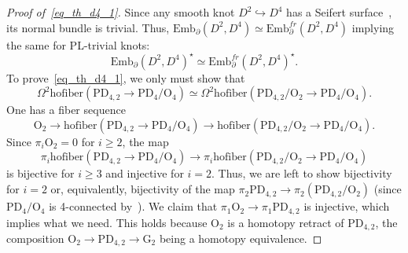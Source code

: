 \documentclass[11pt]{amsart}
\theoremstyle{definition}
\newcommand{\Ebar}{\overline{\mathrm{Emb}}}
\newcommand{\Emb}{\mathrm{Emb}}
\newcommand{\PL}{\mathrm{PL}}
\newcommand{\OO}{\mathrm{O}}
\newcommand{\PD}{\mathrm{PD}}
\newcommand{\hofiber}{\mathrm{hofiber}}
\numberwithin{equation}{section}
\begin{document}
\begin{proof}[Proof of~\eqref{eq_th_d4_1}]
\smallskip

Since any smooth knot $D^2\hookrightarrow D^4$ has a Seifert surface~\cite{Levine}, its normal bundle is trivial. Thus,
$\Emb_\partial(D^2,D^4)\simeq \Emb_\partial^{fr}(D^2,D^4)$ implying the same for PL-trivial knots:
\begin{equation}\label{eq:42}
\Emb_\partial(D^2,D^4)^\star\simeq \Emb_\partial^{fr}(D^2,D^4)^\star.
\end{equation}
To prove~\eqref{eq_th_d4_1}, we only must show that
\[
\Omega^2\hofiber(\PD_{4,2}\to\PD_4/\OO_4)\simeq\Omega^2\hofiber(\PD_{4,2}/\OO_2\to\PD_4/\OO_4).
\]
One has a fiber sequence
\[
\OO_2\to\hofiber(\PD_{4,2}\to\PD_4/\OO_4)\to\hofiber(\PD_{4,2}/\OO_2\to\PD_4/\OO_4).
\]
Since $\pi_i\OO_2=0$ for $i\geq 2$, the map
\[
\pi_i\hofiber(\PD_{4,2}\to\PD_4/\OO_4)\to\pi_i\hofiber(\PD_{4,2}/\OO_2\to\PD_4/\OO_4)
\]
is bijective for $i\geq 3$ and injective for $i=2$. Thus, we are left to show bijectivity for $i=2$ or, equivalently,
bijectivity of the map $\pi_2\PD_{4,2}\to\pi_2(\PD_{4,2}/\OO_2)$ (since $\PD_4/\OO_4$ is 4-connected by~\cite[Theorem~8.3C]{FQ}). We claim that $\pi_1\OO_2\to\pi_1\PD_{4,2}$ is 
injective, which implies what we need. This holds because $\OO_2$ is a homotopy retract of $\PD_{4,2}$, the composition
$\OO_2\to\PD_{4,2}\to \mathrm{G}_2$ being a homotopy equivalence. %

\smallskip


\end{proof}
\end{document}
